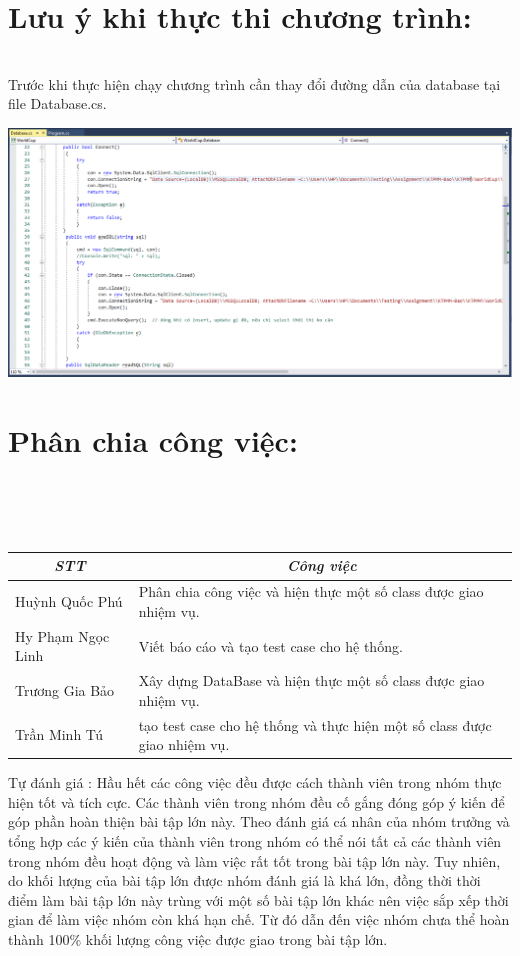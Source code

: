\documentclass[a4paper]{article}
\begin{document}
\section{Lưu ý khi thực thi chương trình: }\\
Trước khi thực hiện chạy chương trình cần thay đổi đường dẫn của database tại file Database.cs.
\begin{center}
\includegraphics[scale=0.3]{NOTE.png}    
\end{center}
\newpage
\section{Phân chia công việc:}\\
\\

\\
\begin{table}[htbp]
\centering
\begin{tabularx}{\linewidth}{|l|X|}
\hline
\multicolumn{1}{|c|}{\textit{\textbf{STT}}} & \multicolumn{1}{c|}{\textit{\textbf{Công việc}}}                                                   \tabularnewline \hline
Huỳnh Quốc Phú & Phân chia công việc và hiện thực một số class được giao nhiệm vụ.                                                     \tabularnewline \hline
Hy Phạm Ngọc Linh & Viết báo cáo và tạo test case cho hệ thống.                                                      \tabularnewline \hline
Trương Gia Bảo &  Xây dựng DataBase và hiện thực một số class được giao nhiệm vụ.                        \tabularnewline \hline
Trần Minh Tú & tạo test case cho hệ thống và thực hiện một số class được giao nhiệm vụ.\tabularnewline \hline
\end{tabularx}
\end{table}
Tự đánh giá : Hầu hết các công việc đều được cách thành viên trong nhóm thực hiện tốt và tích cực. Các thành viên trong nhóm đều cố gắng đóng góp ý kiến để góp phần hoàn thiện bài tập lớn này. Theo đánh giá cá nhân của nhóm trưởng và tổng hợp các ý kiến của thành viên trong nhóm có thể nói tất cả các thành viên trong nhóm đều hoạt động và làm việc rất tốt trong bài tập lớn này. Tuy nhiên, do khối lượng của bài tập lớn được nhóm đánh giá là khá lớn, đồng thời thời điểm làm bài tập lớn này trùng với một số bài tập lớn khác nên việc sắp xếp thời gian để làm việc nhóm còn khá hạn chế. Từ đó dẫn đến việc nhóm chưa thể hoàn thành 100\% khối lượng công việc được giao trong bài tập lớn.
\end{document}
